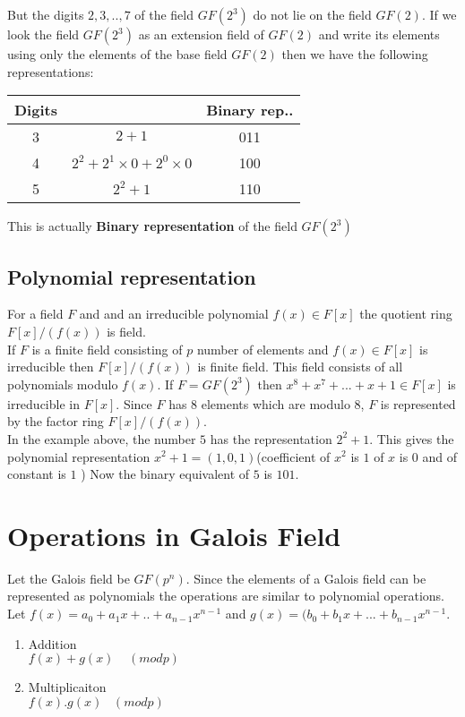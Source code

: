 But the digits \(2,3,..,7\) of the field \(GF(2^3)\) do not lie on the field \(GF(2)\). If we look the field \(GF(2^3)\) as an extension field of \(GF(2)\) and write its elements using only the elements of the base field \(GF(2)\) then we have the following representations:
\vspace{3mm}

\begin{tabular}{|c|c|c|}
    \hline
    Digits & \ & Binary rep..\\
    \hline
    3 & \(2+1\) & 011 \\
    4 & \(2^2+2^1 \times 0 +2^0 \times 0\) & 100 \\
    5 & \(2^2+1\) & 110 \\
    \hline
\end{tabular}
\vspace{3mm}

This is actually \textbf{Binary representation} of the field \(GF(2^3)\)



\subsection{Polynomial representation}
For a field \(F\) and and an irreducible polynomial \(f(x) \in F[x]\) the quotient ring \(F[x]/(f(x))\) is field.\\
If \(F\) is a finite field consisting of \(p\) number of elements and \(f(x) \in F[x]\) is irreducible then \(F[x]/(f(x))\) is finite field. This field consists of all polynomials modulo \(f(x)\). If \(F=GF(2^3)\) then \(x^8+x^7+...+x+1 \in F[x]\) is irreducible in \(F[x]\). Since \(F\) has \(8\) elements which are modulo \(8\), \(F\) is represented by the factor ring \(F[x]/(f(x))\). \\


In the example above, the number \(5\) has the representation \(2^2+1\). This gives the polynomial representation \(x^2+1=(1,0,1)\)(coefficient of \(x^2\) is \(1\) of \(x\) is \(0\) and of constant is \(1\) ) Now the binary equivalent of \(5\) is \(101\).

\section{Operations in Galois Field}
Let the Galois field be \(GF(p^n)\). Since the elements of a Galois field can be represented as polynomials the operations are similar to polynomial operations. Let \(f(x)=a_0+a_1x+..+a_{n-1}x^{n-1}\) and \(g(x)=(b_0+b_1x+...+b_{n-1}x^{n-1}\).
\begin{enumerate}
  \item Addition \\
  \(f(x)+g(x)\;\;\;\; (modp)\) 
  \item Multiplicaiton \\
  \(f(x).g(x)\;\;\; (modp)\)
\end{enumerate}


